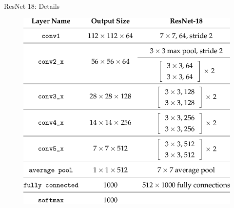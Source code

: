 \documentclass{beamer}
\begin{document}
\begin{frame}{ResNet 18: Details}
\begin{figure}
    \centering
    \includegraphics[scale=0.3]{images/resnet18table.png}
\end{figure}    
\end{frame}
\end{document}
